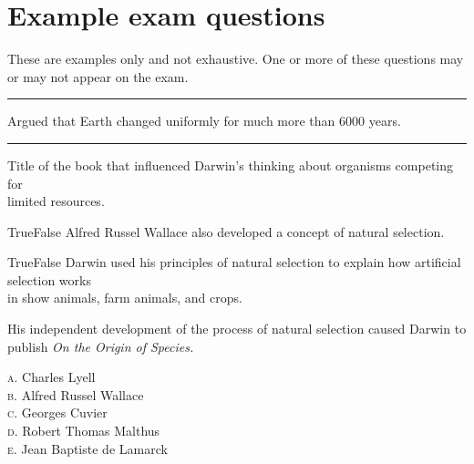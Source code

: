 \documentclass[letterpaper]{tufte-handout}
\begin{document}
\section*{Example exam questions}

These are examples only and not exhaustive. One or more of these questions may or may not appear on the exam.

\begin{fullwidth}

\bigskip

\noindent \rule{1in}{0.4pt} Argued that Earth changed uniformly for much more than 6000 years.

\bigskip

\noindent \rule{1in}{0.4pt} Title of the book that influenced Darwin's thinking about organisms competing for\\
\noindent\hspace*{1in} limited resources.

\bigskip

\noindent True\hspace{1em}False\hspace{1em} Alfred Russel Wallace also developed a concept of natural selection. 

\bigskip

\noindent True\hspace{1em}False\hspace{1em} Darwin used his principles of natural selection to explain how artificial selection works \\
\noindent {} in show animals, farm animals, and crops.

\bigskip

\noindent His independent development of the process of natural selection caused Darwin to publish \textit{On the Origin of Species.}

\smallskip

\noindent \textsc{a}. Charles Lyell\\
\noindent \textsc{b}. Alfred Russel Wallace\\
\noindent \textsc{c}. Georges Cuvier\\
\noindent \textsc{d}. Robert Thomas Malthus\\
\noindent \textsc{e}. Jean Baptiste de Lamarck\\

\end{fullwidth}
\end{document}

